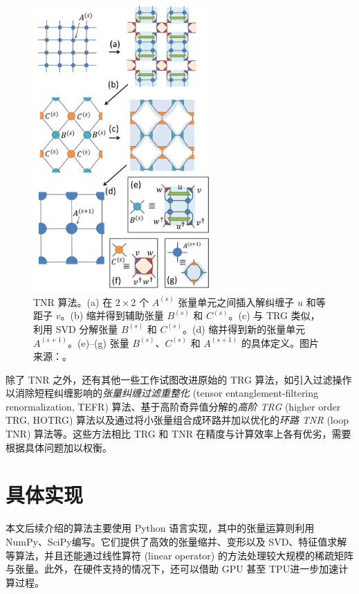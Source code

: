 \begin{figure}[htb]
  \centering
  \includegraphics[width=0.6\textwidth]{images/tensor-network/tnr.pdf}
  \caption[TNR 算法]{TNR 算法。(a) 在 $2\times2$ 个 $A^{(s)}$ 张量单元之间插入解纠缠子 $u$ 和等距子 $v$。(b) 缩并得到辅助张量 $B^{(s)}$ 和 $C^{(s)}$。(c) 与 TRG 类似，利用 SVD 分解张量 $B^{(s)}$ 和 $C^{(s)}$。(d) 缩并得到新的张量单元 $A^{(s+1)}$。(e)--(g) 张量 $B^{(s)}$、$C^{(s)}$ 和 $A^{(s+1)}$ 的具体定义。图片来源：\parencite{evenbly2015tensor1}。}
  \label{fig:tnr}
\end{figure}

除了 TNR 之外，还有其他一些工作试图改进原始的 TRG 算法，如引入过滤操作以消除短程纠缠影响的\emph{张量纠缠过滤重整化} (tensor entanglement-filtering renormalization, TEFR) 算法\cite{gu2009tensor1}、基于高阶奇异值分解的\emph{高阶 TRG} (higher order TRG, HOTRG) 算法\cite{xie2012coarse}以及通过将小张量组合成环路并加以优化的\emph{环路 TNR} (loop TNR) 算法\cite{yang2017loop}等。这些方法相比 TRG 和 TNR 在精度与计算效率上各有优劣，需要根据具体问题加以权衡。

\section{具体实现}

本文后续介绍的算法主要使用 Python 语言实现，其中的张量运算则利用 NumPy\cite{harris2020array}、SciPy\cite{virtanen2020scipy}编写。它们提供了高效的张量缩并、变形以及 SVD、特征值求解等算法，并且还能通过线性算符 (linear operator) 的方法处理较大规模的稀疏矩阵与张量。此外，在硬件支持的情况下，还可以借助 GPU 甚至 TPU\cite{ganahl2023density}进一步加速计算过程。

